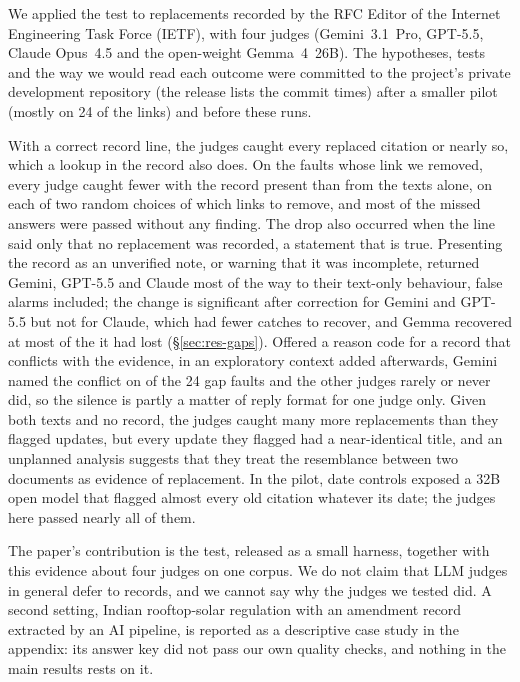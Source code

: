We applied the test to \ENLinks{} replacements recorded by the RFC Editor of the Internet Engineering Task Force (IETF), with four judges (Gemini~3.1~Pro,
GPT-5.5, Claude Opus~4.5 and the open-weight Gemma~4~26B). The hypotheses, tests and the way we would read each outcome
were committed to the project's private development repository (the release lists the commit times) after a smaller pilot (mostly on 24 of the links) and before these runs.

With a correct record line, the judges caught every replaced citation or nearly so, which a lookup in the record
also does. On the faults whose link we removed, every judge caught fewer with the record present than from the texts
alone, on each of two random choices of which links to remove, and most of the missed answers were passed without
any finding. The drop also occurred when the line said only that no replacement was recorded, a statement that is
true. Presenting the record as an unverified note, or warning that it was incomplete, returned Gemini, GPT-5.5 and
Claude most of the way to their text-only behaviour, false alarms included; the change is significant after correction
for Gemini and GPT-5.5 but not for Claude, which had fewer catches to recover, and Gemma recovered at most \EGemmaArmCaveatGained{} of the \EGemmaHTwoaLost{}
it had lost (\S\ref{sec:res-gaps}). Offered a reason code for a record that conflicts with the evidence, in an
exploratory context added afterwards, Gemini named the conflict on \EGeminiConflictCodeGap{} of the 24 gap faults and
the other judges rarely or never did, so the silence is partly a matter of reply format for one judge only. Given both texts and no record, the judges caught many more replacements than they
flagged updates, but every update they flagged had a near-identical title, and an unplanned analysis suggests that
they treat the resemblance between two documents as evidence of replacement.
In the pilot, date controls exposed a 32B open model that flagged almost every old citation whatever its date; the
judges here passed nearly all of them.

The paper's contribution is the test, released as a small harness, together with this evidence about four judges on
one corpus. We do not claim that LLM judges in general defer to records, and we cannot say why the judges we tested
did. A second setting, Indian rooftop-solar regulation with an amendment record extracted by an AI pipeline, is
reported as a descriptive case study in the appendix: its answer key did not pass our own quality checks, and nothing
in the main results rests on it.
